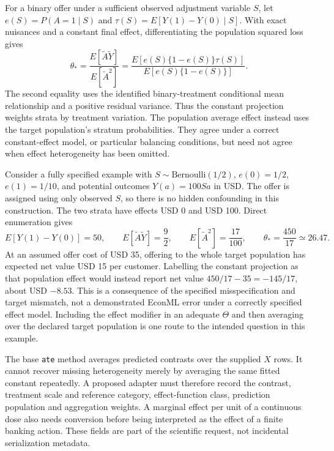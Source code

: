 For a binary offer under a sufficient observed adjustment variable $S$, let
$e(S)=P(A=1\mid S)$ and $\tau(S)=E[Y(1)-Y(0)\mid S]$. With exact
nuisances and a constant final effect, differentiating the population squared
loss gives
\begin{equation}
 \theta_*=
 \frac{E[\widetilde A\widetilde Y]}{E[\widetilde A^2]}
 =\frac{E[e(S)\{1-e(S)\}\tau(S)]}
        {E[e(S)\{1-e(S)\}]}.
 \label{exec19:econml-projection}
\end{equation}
The second equality uses the identified binary-treatment conditional mean
relationship and a positive residual variance. Thus the constant projection
weights strata by treatment variation. The population average effect instead
uses the target population's stratum probabilities. They agree under a
correct constant-effect model, or particular balancing conditions, but need
not agree when effect heterogeneity has been omitted.
\citep{exec19_econml_reference}

Consider a fully specified example with $S\sim\mathrm{Bernoulli}(1/2)$,
$e(0)=1/2$, $e(1)=1/10$, and potential outcomes $Y(a)=100Sa$ in USD.
The offer is assigned using only observed $S$, so there is no hidden
confounding in this construction. The two strata have effects USD 0 and
USD 100. Direct enumeration gives
\begin{equation}
 E[Y(1)-Y(0)]=50,\qquad
 E[\widetilde A\widetilde Y]=\frac92,\qquad
 E[\widetilde A^2]=\frac{17}{100},\qquad
 \theta_*=\frac{450}{17}\simeq26.47.
 \label{exec19:econml-money}
\end{equation}
At an assumed offer cost of USD 35, offering to the whole target population
has expected net value USD 15 per customer. Labelling the constant projection
as that population effect would instead report net value
$450/17-35=-145/17$, about USD $-8.53$. This is a consequence of the
specified misspecification and target mismatch, not a demonstrated EconML
error under a correctly specified effect model. Including the effect modifier
in an adequate $\Theta$ and then averaging over the declared target population
is one route to the intended question in this example.
\citep{exec19_econml_reference}

The base \texttt{ate} method averages predicted contrasts over the supplied
$X$ rows. It cannot recover missing heterogeneity merely by averaging the
same fitted constant repeatedly. A proposed adapter must therefore record
the contrast, treatment scale and reference category, effect-function class,
prediction population and aggregation weights. A marginal effect per unit
of a continuous dose also needs conversion before being interpreted as the
effect of a finite banking action. These fields are part of the scientific
request, not incidental serialization metadata.\citep{exec19_econml_source}

